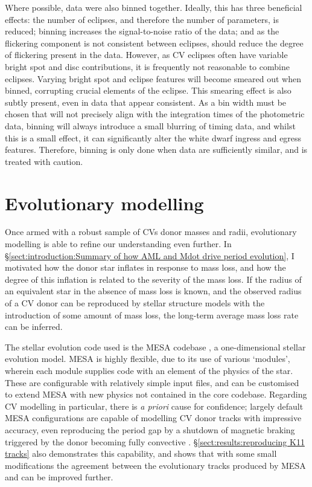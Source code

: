 Where possible, data were also binned together. Ideally, this has three beneficial effects: the number of eclipses, and therefore the number of parameters, is reduced; binning increases the signal-to-noise ratio of the data; and as the flickering component is not consistent between eclipses, should reduce the degree of flickering present in the data. However, as CV eclipses often have variable bright spot and disc contributions, it is frequently not reasonable to combine eclipses. Varying bright spot and eclipse features will become smeared out when binned, corrupting crucial elements of the eclipse.
This smearing effect is also subtly present, even in data that appear consistent. As a bin width must be chosen that will not precisely align with the integration times of the photometric data, binning will always introduce a small blurring of timing data, and whilst this is a small effect, it can significantly alter the white dwarf ingress and egress features.
Therefore, binning is only done when data are sufficiently similar, and is treated with caution.



\section{Evolutionary modelling}
\label{sect:modelling:evolutionary modelling}

Once armed with a robust sample of CVs donor masses and radii, evolutionary modelling is able to refine our understanding even further. In \S\ref{sect:introduction:Summary of how AML and Mdot drive period evolution}, I motivated how the donor star inflates in response to mass loss, and how the degree of this inflation is related to the severity of the mass loss.
If the radius of an equivalent star in the absence of mass loss is known, and the observed radius of a CV donor can be reproduced by stellar structure models with the introduction of some amount of mass loss, the long-term average mass loss rate can be inferred.

The stellar evolution code used is the MESA codebase \citep{paxton2011,paxton2013,Paxton_2015,paxton2019}, a one-dimensional stellar evolution model. MESA is highly flexible, due to its use of various `modules', wherein each module supplies code with an element of the physics of the star. These are configurable with relatively simple input files, and can be customised to extend MESA with new physics not contained in the core codebase.
Regarding CV modelling in particular, there is \textit{a priori} cause for confidence; largely default MESA configurations are capable of modelling CV donor tracks with impressive accuracy, even reproducing the period gap by a shutdown of magnetic braking triggered by the donor becoming fully convective \citep{Paxton_2015}.
\S\ref{sect:results:reproducing K11 tracks} also demonstrates this capability, and shows that with some small modifications the agreement between the evolutionary tracks produced by MESA and \citet{knigge11} can be improved further.

